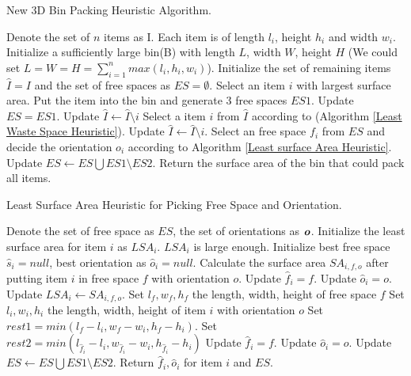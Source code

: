 \documentclass[sigconf]{acmart}
\newcommand{\bi}[1]{\textbf{\textit{#1}}}
\begin{document}
\begin{algorithm}[!htb]                  %
	\caption{New 3D Bin Packing Heuristic Algorithm. }       
	\label{3D bin packing heuristic algorithm} 
	\begin{algorithmic}[1]
		\State Denote the set of $n$ items as I. Each item is of length $l_i$, height $h_i$ and width $w_i$.
		\State Initialize a sufficiently large bin(B) with length $L$, width $W$, height $H$ (We could set $L=W = H = \sum_{i=1}^n max(l_i,h_i,w_i)$).
		\State Initialize the set of remaining items $\hat{I} = I$ and the set of free spaces as $ES = \emptyset$.
		\State  Select an item $i$ with largest surface area. 
		\State Put the item into the bin and generate 3 free spaces $ES1$. 
		\State Update $ES = ES1$.
		\State Update $\hat{I}  \leftarrow  \hat{I} \setminus i$
		\Else
		\State Select a item $i$ from $\hat{I}$ according to (Algorithm \ref{Least Waste Space Heuristic}). 
		\State Update $\hat{I}  \leftarrow  \hat{I} \setminus i$.
		\State Select an free space $f_i$ from $ES$ and decide the orientation $o_i$ according to Algorithm \ref{Least surface Area Heuristic}. 
		\State Update $ES  \leftarrow ES  \bigcup ES1  \setminus ES2$.
		\EndIf      
		\EndFor
		\State Return the surface area of the bin that could pack all items.
	\end{algorithmic}
\end{algorithm}

\begin{algorithm}[!htb]                 %
	\caption{Least Surface Area Heuristic for Picking Free Space and Orientation. }       
	\label{Least surface Area Heuristic} 
	\begin{algorithmic}[1]
		\State Denote the set of free space as $ES$, the set of orientations as $\bi{o}$. 
		\State Initialize the least surface area for item $i$ as $LSA_i$. $LSA_i$ is large enough. 
		\State Initialize best free space $\hat{s}_{i} =null$, best orientation as $\hat{o}_i = null$.
		\For{each orientation $o \in \bi{o}$}
		\State Calculate the surface area $SA_{i,f,o}$ after putting item $i$ in free space $f$ with orientation $o$.
		\State Update $\hat{f}_{i} =f$. 
		\State Update $\hat{o}_i = o$.
		\State Update $LSA_i  \leftarrow SA_{i,f,o}  $.
		\State Set $l_f, w_f, h_f$ the length, width, height of free space $f$ 
		\State Set $l_i, w_i, h_i$ the length, width, height of item $i$ with orientation $o$       
		\State  Set $rest1 = min(l_f-l_i, w_f-w_i, h_f-h_i)$. 
		\State  Set $rest2 = min(l_{\hat{f}_{i}}-l_i, w_{\hat{f}_{i}}-w_i, h_{\hat{f}_{i}}-h_i)$ 
		\State Update $\hat{f}_{i} =f$.
		\State Update $\hat{o}_i = o$.
		\EndIf	
		\EndIf 
		\EndFor
		\EndFor
		\State  Update $ES  \leftarrow ES  \bigcup ES1  \setminus ES2$.
		\State Return $\hat{f}_{i}, \hat{o}_i$ for item $i$ and $ES$.
	\end{algorithmic}
\end{algorithm}
\end{document}
